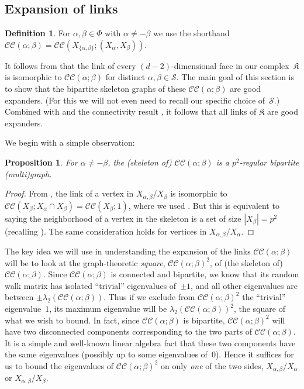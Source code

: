 \documentclass[10pt,a4paper]{article}
\newtheorem{proposition}[theorem]{Proposition}
\theoremstyle{definition}
\newtheorem{definition}[theorem]{Definition}
\newcommand{\calS}{\mathcal{S}}
\newcommand{\CC}[2]{\mathcal{C}\mathcal{C}(#1;#2)}
\newcommand{\complex}{\mathfrak{K}}
\begin{document}
\subsection{Expansion of links}\label{sec:explink}

\begin{definition}
    For $\alpha,\beta \in \Phi$ with $\alpha \neq -\beta$ we use the shorthand $\CC{\alpha}{\beta} = \CC{X_{\{\alpha,\beta\}} }{(X_\alpha,X_\beta)}$.
\end{definition}
It follows from  that the link of every $(d-2)$-dimensional face in our complex~$\complex$ is isomorphic to $\CC{\alpha}{\beta}$ for distinct $\alpha,\beta \in \calS$.  The main goal of this section is to show that the bipartite skeleton graphs of these $\CC{\alpha}{\beta}$ are good expanders.  (For this we will not even need to recall our specific choice of~$\calS$.) Combined with  and the connectivity result , it follows that all links of $\complex$ are good expanders.

We begin with a simple observation:
\begin{proposition}
    For $\alpha \neq -\beta$, the (skeleton of) $\CC{\alpha}{\beta}$ is a $p^2$-regular bipartite (multi)graph.
\end{proposition}
\begin{proof}
    From , the link of a vertex in $X_{\alpha,\beta}/X_\beta$ is isomorphic to $\CC{X_\beta}{X_\alpha \cap X_\beta} = \CC{X_\beta}{1}$, where we used .  
    But this is equivalent to saying the neighborhood of a vertex in the skeleton is a set of size $|X_\beta| = p^2$ (recalling ).  The same consideration holds for vertices in $X_{\alpha,\beta}/X_\alpha$.
\end{proof}

The key idea we will use in understanding the expansion of  the links $\CC{\alpha}{\beta}$ will be to look at the graph-theoretic \emph{square}, $\CC{\alpha}{\beta}^2$, of (the skeleton of) $\CC{\alpha}{\beta}$.  Since $\CC{\alpha}{\beta}$ is connected and bipartite, we know that its random walk matrix has isolated ``trivial'' eigenvalues of~$\pm 1$, and all other eigenvalues are between $\pm \lambda_2(\CC{\alpha}{\beta})$.  Thus if we exclude from $\CC{\alpha}{\beta}^2$ the ``trivial'' eigenvalue~$1$, its maximum eigenvalue will be $\lambda_2(\CC{\alpha}{\beta})^2$, the square of what we wish to bound.  In fact, since $\CC{\alpha}{\beta}$ is bipartite, $\CC{\alpha}{\beta}^2$ will have two disconnected components corresponding to the two parts of $\CC{\alpha}{\beta}$.  It is a simple and well-known linear algebra fact that these two components have the same eigenvalues (possibly up to some eigenvalues of~$0$).
Hence it suffices for us to bound the eigenvalues of $\CC{\alpha}{\beta}^2$ on only \emph{one} of the two sides, $X_{\alpha,\beta}/X_\alpha$ or $X_{\alpha,\beta}/X_\beta$.  
\end{document}
